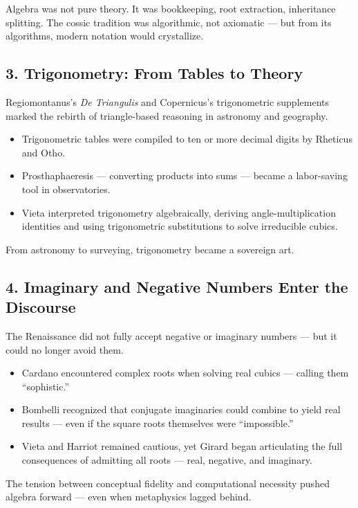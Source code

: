 \documentclass[9pt]{article}
\begin{document}
Algebra was not pure theory. It was bookkeeping, root extraction, inheritance splitting. The cossic tradition was algorithmic, not axiomatic — but from its algorithms, modern notation would crystallize.

\subsection*{3. Trigonometry: From Tables to Theory}

Regiomontanus’s \textit{De Triangulis} and Copernicus’s trigonometric supplements marked the rebirth of triangle-based reasoning in astronomy and geography.

\begin{itemize}
    \item Trigonometric tables were compiled to ten or more decimal digits by Rheticus and Otho.
    \item Prosthaphaeresis — converting products into sums — became a labor-saving tool in observatories.
    \item Vieta interpreted trigonometry algebraically, deriving angle-multiplication identities and using trigonometric substitutions to solve irreducible cubics.
\end{itemize}

From astronomy to surveying, trigonometry became a sovereign art.

\subsection*{4. Imaginary and Negative Numbers Enter the Discourse}

The Renaissance did not fully accept negative or imaginary numbers — but it could no longer avoid them.

\begin{itemize}
    \item Cardano encountered complex roots when solving real cubics — calling them ``sophistic.''
    \item Bombelli recognized that conjugate imaginaries could combine to yield real results — even if the square roots themselves were ``impossible.''
    \item Vieta and Harriot remained cautious, yet Girard began articulating the full consequences of admitting all roots — real, negative, and imaginary.
\end{itemize}

The tension between conceptual fidelity and computational necessity pushed algebra forward — even when metaphysics lagged behind.
\end{document}
